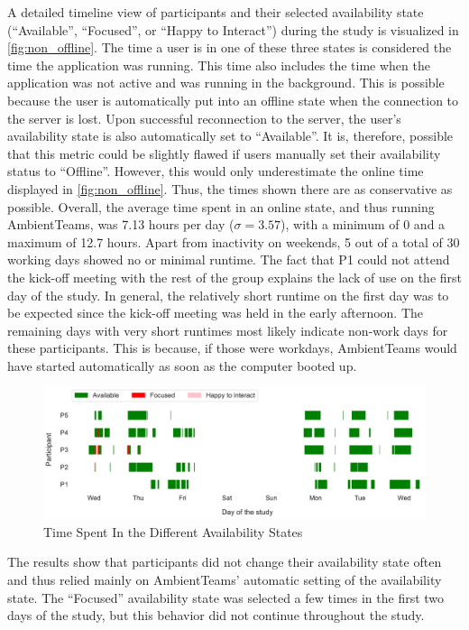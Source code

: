 A detailed timeline view of participants and their selected availability state (\enquote{Available}, \enquote{Focused}, or \enquote{Happy to Interact}) during the study is visualized in \autoref{fig:non_offline}. The time a user is in one of these three states is considered the time the application was running. This time also includes the time when the application was not active and was running in the background. This is possible because the user is automatically put into an offline state when the connection to the server is lost. Upon successful reconnection to the server, the user's availability state is also automatically set to \enquote{Available}. It is, therefore, possible that this metric could be slightly flawed if users manually set their availability status to \enquote{Offline}. However, this would only underestimate the online time displayed in \autoref{fig:non_offline}. Thus, the times shown there are as conservative as possible. Overall, the average time spent in an online state, and thus running AmbientTeams, was 7.13 hours per day ($\sigma=3.57$), with a minimum of 0 and a maximum of 12.7 hours. Apart from inactivity on weekends, 5 out of a total of 30 working days showed no or minimal runtime. The fact that P1 could not attend the kick-off meeting with the rest of the group explains the lack of use on the first day of the study. In general, the relatively short runtime on the first day was to be expected since the kick-off meeting was held in the early afternoon. The remaining days with very short runtimes most likely indicate non-work days for these participants. This is because, if those were workdays, AmbientTeams would have started automatically as soon as the computer booted up.

\begin{figure}[h]
    \centering
    \includegraphics[width=\linewidth]{plots/non_offline.pdf}
    \caption{Time Spent In the Different Availability States}
    \label{fig:non_offline}
\end{figure}

The results show that participants did not change their availability state often and thus relied mainly on AmbientTeams' automatic setting of the availability state. The \enquote{Focused} availability state was selected a few times in the first two days of the study, but this behavior did not continue throughout the study.

